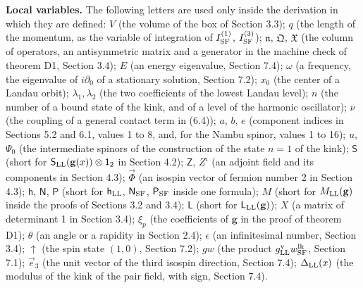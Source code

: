 \documentclass[
  10pt,
]{article}
\begin{document}
\textbf{Local variables.} The following letters are used only inside the
derivation in which they are defined: \(V\) (the volume of the box of
Section 3.3); \(q\) (the length of the momentum, as the variable of
integration of \(I^{(1)}_{\rm SF}\), \(I^{(3)}_{\rm SF}\));
\(\mathfrak n\), \(\mathfrak Q\), \(\mathfrak X\) (the column of
operators, an antisymmetric matrix and a generator in the machine check
of theorem D1, Section 3.4); \(E\) (an energy eigenvalue, Section 7.4);
\(\omega\) (a frequency, the eigenvalue of \(i\partial_0\) of a
stationary solution, Section 7.2); \(x_0\) (the center of a Landau
orbit); \(\lambda_1,\lambda_2\) (the two coefficients of the lowest
Landau level); \(n\) (the number of a bound state of the kink, and of a
level of the harmonic oscillator); \(\nu\) (the coupling of a general
contact term in (6.4)); \(a\), \(b\), \(e\) (component indices in
Sections 5.2 and 6.1, values 1 to 8, and, for the Nambu spinor, values 1
to 16); \(u\), \(\Psi_0\) (the intermediate spinors of the construction
of the state \(n=1\) of the kink); \(\mathsf S\) (short for
\(\mathsf S_{\rm LL}(\mathbf g(x))\otimes\mathsf 1_2\) in Section 4.2);
\(\mathsf Z\), \(Z^\iota\) (an adjoint field and its components in
Section 4.3); \(\vec\Phi\) (an isospin vector of fermion number 2 in
Section 4.3); \(\mathsf h\), \(\mathsf N\), \(\mathsf P\) (short for
\(\mathsf h_{\rm LL}\), \(\mathsf N_{\rm SF}\), \(\mathsf P_{\rm SF}\)
inside one formula); \(M\) (short for \(M_{\rm LL}(\mathbf g)\) inside
the proofs of Sections 3.2 and 3.4); \(\mathsf L\) (short for
\(\mathsf L_{\rm LL}(\mathbf g)\)); \(X\) (a matrix of determinant 1 in
Section 3.4); \(\xi_p\) (the coefficients of \(\mathbf g\) in the proof
of theorem D1); \(\theta\) (an angle or a rapidity in Section 2.4);
\(\epsilon\) (an infinitesimal number, Section 3.4); \(\uparrow\) (the
spin state \((1,0)\), Section 7.2); \(gw\) (the product
\(g^{\rm v}_{\rm LL}w^{\rm lk}_{\rm SF}\), Section 7.1); \(\vec e_3\)
(the unit vector of the third isospin direction, Section 7.4);
\(\Delta_{\rm LL}(x)\) (the modulus of the kink of the pair field, with
sign, Section 7.4).
\end{document}
